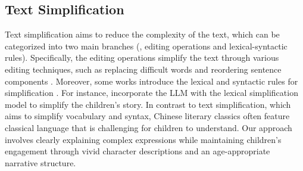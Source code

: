 \subsection{Text Simplification}
Text simplification aims to reduce the complexity of the text, 
which can be categorized into two main branches (\ie, editing operations and lexical-syntactic rules).
Specifically, 
the editing operations simplify the text through various editing techniques, such as replacing difficult words and reordering sentence components \cite{edit-ts-1,edit-ts-2}. 
Moreover, some works introduce the lexical and syntactic rules for simplification \cite{ts-lsbert,child-ts}.
For instance, \citet{child-ts} incorporate the LLM with the lexical simplification model to simplify the children's story.
In contrast to text simplification, which aims to simplify vocabulary and syntax, Chinese literary classics often feature classical language that is challenging for children to understand. 
Our approach involves clearly explaining complex expressions while maintaining children's engagement through vivid character descriptions and an age-appropriate narrative structure.